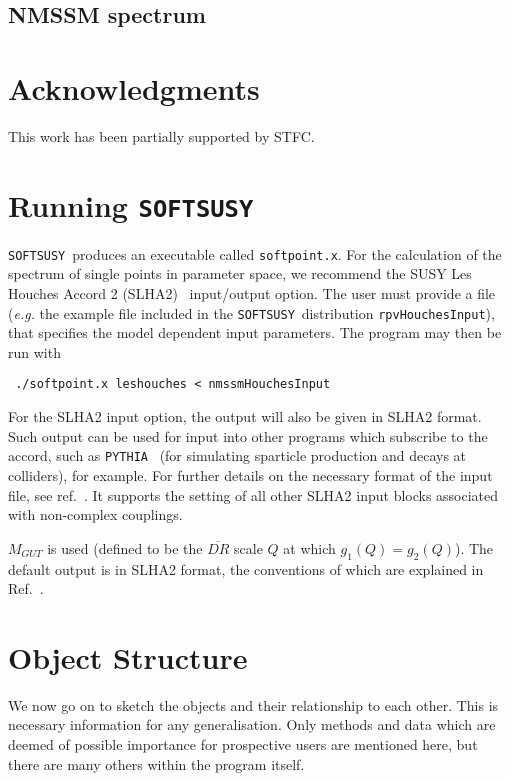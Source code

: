 \documentclass[final,3p,times,pdflatex]{elsarticle}
\def\SOFTSUSY{{\tt SOFTSUSY}}
\def\code#1{\small{\tt #1}\normalsize}
\begin{document}
\subsection{NMSSM spectrum \label{spec}}



\section*{Acknowledgments}
This work has been partially supported by 
STFC\@. 


\appendix

\section{Running \SOFTSUSY}
\label{sec:run}

\SOFTSUSY~produces an executable called \code{softpoint.x}. For the calculation
of the spectrum of single points in parameter space, we recommend the
SUSY Les Houches Accord 2 (SLHA2)~\cite{Allanach:2008qq}  input/output
option. The user must provide a file (\textit{e.g.} the example file included
in the \SOFTSUSY~distribution
\code{rpvHouchesInput}), that specifies the model dependent input
parameters. The program may then be run with
\small
\begin{verbatim}
 ./softpoint.x leshouches < nmssmHouchesInput
\end{verbatim}
\normalsize
For the SLHA2 input option, 
the output will also be given in 
SLHA2 format. Such output can be used for
input into other programs which subscribe to the accord, such as
\code{PYTHIA}~\cite{Sjostrand:2007gs} (for
simulating sparticle production and decays at colliders), for example. For
further details on the necessary format of 
the input file, see ref.~\cite{Allanach:2008qq}. It supports 
the setting of all other SLHA2 input blocks associated with non-complex
couplings. 

$M_{GUT}$ is used (defined to be the $\overline{DR}$ scale $Q$ at which $g_1(Q) =
g_2(Q)$). The default output is in SLHA2 format, the conventions of which are
explained in Ref.~\cite{Allanach:2008qq}. 


\section{Object Structure\label{sec:objects}}

We now go on to sketch the objects and their relationship to each other. This
is necessary information for any generalisation. Only
methods and data which are deemed of possible importance for prospective users
are 
mentioned here, but there are many others within the program itself.
\end{document}

